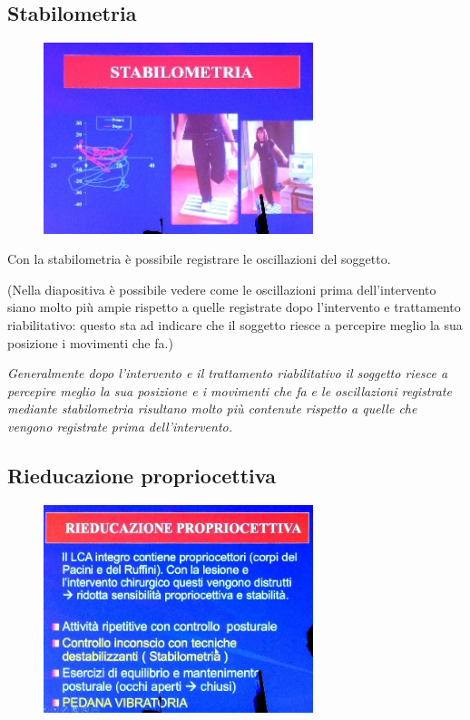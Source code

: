 \subsection{Stabilometria}

\begin{figure}[!ht]
\centering
	\includegraphics[width=0.7\textwidth]{030/image6.jpeg}
\end{figure}

Con la stabilometria è possibile registrare le oscillazioni del
soggetto.

(Nella diapositiva è possibile vedere come le oscillazioni prima
dell'intervento siano molto più ampie rispetto a quelle registrate dopo
l'intervento e trattamento riabilitativo: questo sta ad indicare che il
soggetto riesce a percepire meglio la sua posizione i movimenti che fa.)

\emph{Generalmente dopo l'intervento e il trattamento riabilitativo il
soggetto riesce a percepire meglio la sua posizione e i movimenti che fa
e le oscillazioni registrate mediante stabilometria risultano molto più
contenute rispetto a quelle che vengono registrate prima
dell'intervento. }

\subsection{Rieducazione propriocettiva}

\begin{figure}[!ht]
\centering
	\includegraphics[width=0.7\textwidth]{030/image7.jpeg}
\end{figure}

